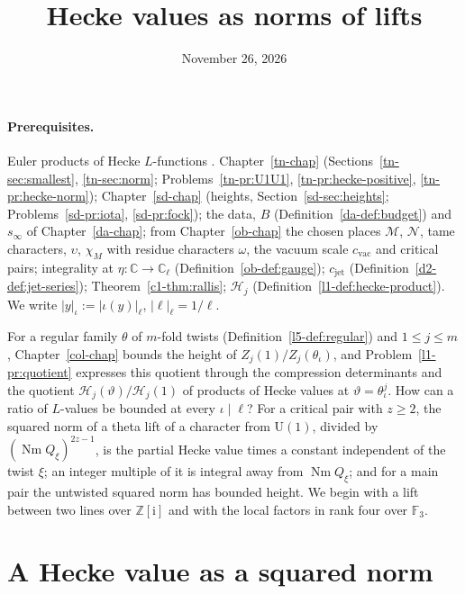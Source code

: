 \documentclass[reqno]{amsart}
\title{Hecke values as norms of lifts}
\author{}
\date{November 26, 2026}
\newcounter{chap}
\theoremstyle{definition}
\theoremstyle{plain}
\theoremstyle{remark}
\newcommand{\Z}{\mathbb{Z}}
\newcommand{\C}{\mathbb{C}}
\newcommand{\F}{\mathbb{F}}
\newcommand{\Mcal}{\mathcal{M}}
\newcommand{\Nc}{\mathcal{N}}
\newcommand{\Hc}{\mathcal{H}}
\newcommand{\ii}{\mathrm{i}}
\newcommand{\Nm}{\operatorname{Nm}}
\newcommand{\cvac}{c_{\mathrm{vac}}}
\newcommand{\cjet}{c_{\mathrm{jet}}}
\begin{document}
\maketitle
{}\label{chap}

\paragraph{Prerequisites.}
Euler products of Hecke \(L\)-functions \cite[Ch.~VII, \S8]{Ne}.  Chapter~\ref{tn-chap} (Sections~\ref{tn-sec:smallest}, \ref{tn-sec:norm}; Problems~\ref{tn-pr:U1U1}, \ref{tn-pr:hecke-positive}, \ref{tn-pr:hecke-norm}); Chapter~\ref{sd-chap} (heights, Section~\ref{sd-sec:heights}; Problems~\ref{sd-pr:iota}, \ref{sd-pr:fock}); the data, \(B\) (Definition~\ref{da-def:budget}) and \(s_\infty\) of Chapter~\ref{da-chap}; from Chapter~\ref{ob-chap} the chosen places \(\Mcal\), \(\Nc\), tame characters, \(\upsilon\), \(\chi_M\) with residue characters \(\omega\), the vacuum scale \(\cvac\) and critical pairs; integrality at \(\eta\colon\C\to\C_\ell\) (Definition~\ref{ob-def:gauge}); \(\cjet\) (Definition~\ref{d2-def:jet-series}); Theorem~\ref{c1-thm:rallis}; \(\Hc_j\) (Definition~\ref{l1-def:hecke-product}).  We write \(\lvert y\rvert_\iota := \lvert\iota(y)\rvert_\ell\), \(\lvert\ell\rvert_\ell = 1/\ell\).

\medskip
For a regular family \(\theta\) of \(m\)-fold twists (Definition~\ref{l5-def:regular}) and \(1 \le j \le m\), Chapter~\ref{col-chap} bounds the height of \(Z_j(1)/Z_j(\theta_\iota)\), and Problem~\ref{l1-pr:quotient} expresses this quotient through the compression determinants and the quotient \(\Hc_j(\vartheta)/\Hc_j(1)\) of products of Hecke values at \(\vartheta = \theta_\iota^j\).  How can a ratio of \(L\)-values be bounded at every \(\iota \mid \ell\)?  For a critical pair with \(z \ge 2\), the squared norm of a theta lift of a character from \(\mathrm U(1)\), divided by \((\Nm Q_\xi)^{2z-1}\), is the partial Hecke value times a constant independent of the twist \(\xi\); an integer multiple of it is integral away from \(\Nm Q_\xi\); and for a main pair the untwisted squared norm has bounded height.  We begin with a lift between two lines over \(\Z[\ii]\) and with the local factors in rank four over \(\F_3\).

\section{A Hecke value as a squared norm}\label{sec:toy}
\end{document}
